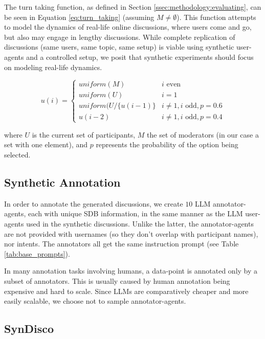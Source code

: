 The turn taking function, as defined in Section \ref{ssec:methodology:evaluating}, can be seen in Equation \ref{eq:turn_taking} (assuming $M \neq \emptyset$). This function attempts to model the dynamics of real-life online discussions, where users come and go, but also may engage in lengthy discussions. While complete replication of discussions (same users, same topic, same setup) is viable using synthetic user-agents and a controlled setup, we posit that synthetic experiments should focus on modeling real-life dynamics.

\begin{equation}
\label{eq:turn_taking}
    u(i) = \left\{
\begin{array}{ll}
    \textit{uniform}(M) & i \text{ even}\\
    \textit{uniform}(U) & i=1\\
    \textit{uniform}(U/\{u(i-1)\} & i \neq 1, i \text{ odd}, p=0.6 \\
    u(i-2) & i \neq 1, i \text{ odd}, p=0.4 
\end{array} 
\right. 
\end{equation}

\noindent where $U$ is the current set of participants, $M$ the set of moderators (in our case a set with one element), and $p$ represents the probability of the option being selected.


\subsection{Synthetic Annotation}

In order to annotate the generated discussions, we create $10$ \ac{LLM} annotator-agents, each with unique \ac{SDB} information, in the same manner as the \ac{LLM} user-agents used in the synthetic discussions. Unlike the latter, the annotator-agents are not provided with usernames (so they don't overlap with participant names), nor intents. The annotators all get the same instruction prompt (see Table \ref{tab:base_prompts}).

In many annotation tasks involving humans, a data-point is annotated only by a subset of annotators. This is usually caused by human annotation being expensive and hard to scale. Since \acp{LLM} are comparatively cheaper and more easily scalable, we choose not to sample annotator-agents.


\subsection{SynDisco}

